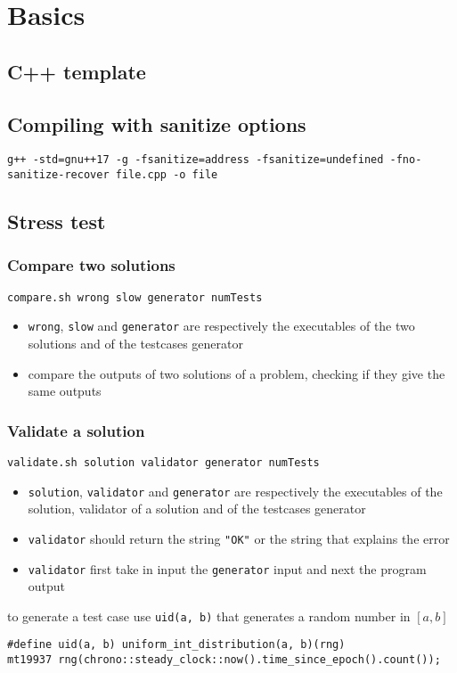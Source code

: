 \section{Basics}

\subsection{C++ template}

\subsection{Compiling with sanitize options}
\begin{lstlisting}[breakatwhitespace=true]
g++ -std=gnu++17 -g -fsanitize=address -fsanitize=undefined -fno-sanitize-recover file.cpp -o file
\end{lstlisting}

\subsection{Stress test}
\subsubsection{Compare two solutions}
\texttt{compare.sh wrong slow generator numTests}

\begin{itemize}
    \item \texttt{wrong}, \texttt{slow} and \texttt{generator} are respectively the executables of the two solutions and of the testcases generator
    \item compare the outputs of two solutions of a problem, checking if they give the same outputs
\end{itemize}



\subsubsection{Validate a solution}
\texttt{validate.sh solution validator generator numTests}
\begin{itemize}
    \item \texttt{solution}, \texttt{validator} and \texttt{generator} are respectively the executables of the solution, validator of a solution and of the testcases generator
    \item \texttt{validator} should return the string \texttt{"OK"} or the string that explains the error
    \item \texttt{validator} first take in input the \texttt{generator} input and next the program output
\end{itemize}



to generate a test case use \texttt{uid(a, b)} that generates a random number in $[a, b]$
\begin{lstlisting}[breakatwhitespace=true]
#define uid(a, b) uniform_int_distribution(a, b)(rng)
mt19937 rng(chrono::steady_clock::now().time_since_epoch().count());
\end{lstlisting}